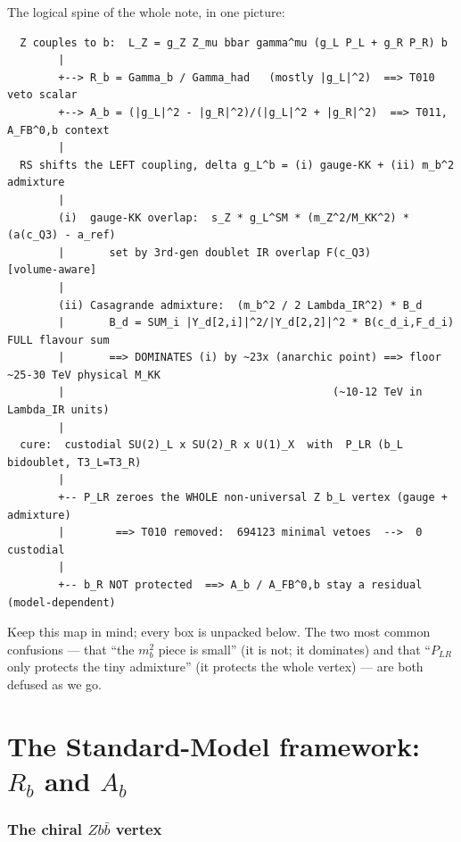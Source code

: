 \documentclass[11pt]{article}
\newcommand{\PLR}{P_{LR}}
\theoremstyle{definition}
\begin{document}
\noindent The logical spine of the whole note, in one picture:
\begin{footnotesize}
\begin{verbatim}
  Z couples to b:  L_Z = g_Z Z_mu bbar gamma^mu (g_L P_L + g_R P_R) b
        |
        +--> R_b = Gamma_b / Gamma_had   (mostly |g_L|^2)  ==> T010 veto scalar
        +--> A_b = (|g_L|^2 - |g_R|^2)/(|g_L|^2 + |g_R|^2)  ==> T011, A_FB^0,b context
        |
  RS shifts the LEFT coupling, delta g_L^b = (i) gauge-KK + (ii) m_b^2 admixture
        |
        (i)  gauge-KK overlap:  s_Z * g_L^SM * (m_Z^2/M_KK^2) * (a(c_Q3) - a_ref)
        |       set by 3rd-gen doublet IR overlap F(c_Q3)            [volume-aware]
        |
        (ii) Casagrande admixture:  (m_b^2 / 2 Lambda_IR^2) * B_d
        |       B_d = SUM_i |Y_d[2,i]|^2/|Y_d[2,2]|^2 * B(c_d_i,F_d_i)   FULL flavour sum
        |       ==> DOMINATES (i) by ~23x (anarchic point) ==> floor ~25-30 TeV physical M_KK
        |                                          (~10-12 TeV in Lambda_IR units)
        |
  cure:  custodial SU(2)_L x SU(2)_R x U(1)_X  with  P_LR (b_L bidoublet, T3_L=T3_R)
        |
        +-- P_LR zeroes the WHOLE non-universal Z b_L vertex (gauge + admixture)
        |        ==> T010 removed:  694123 minimal vetoes  -->  0 custodial
        |
        +-- b_R NOT protected  ==> A_b / A_FB^0,b stay a residual (model-dependent)
\end{verbatim}
\end{footnotesize}
\noindent Keep this map in mind; every box is unpacked below. The two most common
confusions --- that ``the $m_b^2$ piece is small'' (it is not; it dominates) and
that ``$\PLR$ only protects the tiny admixture'' (it protects the whole vertex)
--- are both defused as we go.

\part{The Standard-Model framework: $R_b$ and $A_b$}
\label{part:sm}

\section{The chiral $Zb\bar b$ vertex}
\label{sec:vertex}
\end{document}
